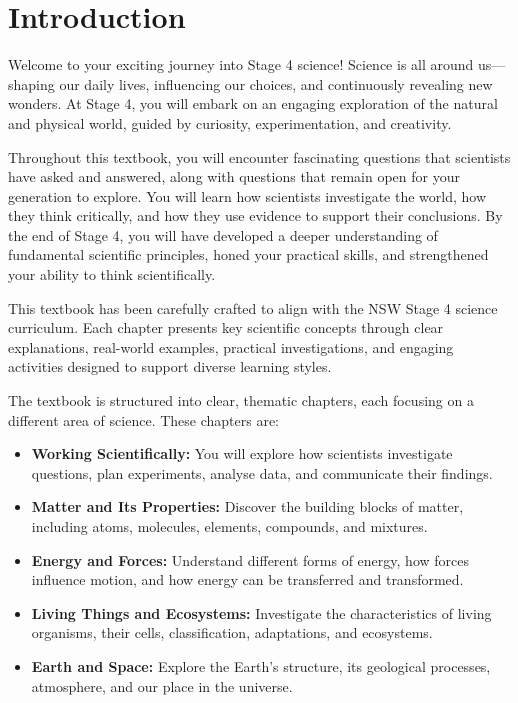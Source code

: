 \chapter{Introduction}

\FloatBarrier
\1

Welcome to your exciting journey into Stage 4 science! Science is all around us—shaping our daily lives, influencing our choices, and continuously revealing new wonders. At Stage 4, you will embark on an engaging exploration of the natural and physical world, guided by curiosity, experimentation, and creativity. 

Throughout this textbook, you will encounter fascinating questions that scientists have asked and answered, along with questions that remain open for your generation to explore. You will learn how scientists investigate the world, how they think critically, and how they use evidence to support their conclusions. By the end of Stage 4, you will have developed a deeper understanding of fundamental scientific principles, honed your practical skills, and strengthened your ability to think scientifically.

\FloatBarrier
\1

This textbook has been carefully crafted to align with the NSW Stage 4 science curriculum. Each chapter presents key scientific concepts through clear explanations, real-world examples, practical investigations, and engaging activities designed to support diverse learning styles.

The textbook is structured into clear, thematic chapters, each focusing on a different area of science. These chapters are:

\begin{itemize}
\item \textbf{Working Scientifically:} You will explore how scientists investigate questions, plan experiments, analyse data, and communicate their findings. 
\item \textbf{Matter and Its Properties:} Discover the building blocks of matter, including atoms, molecules, elements, compounds, and mixtures.
\item \textbf{Energy and Forces:} Understand different forms of energy, how forces influence motion, and how energy can be transferred and transformed.
\item \textbf{Living Things and Ecosystems:} Investigate the characteristics of living organisms, their cells, classification, adaptations, and ecosystems.
\item \textbf{Earth and Space:} Explore the Earth's structure, its geological processes, atmosphere, and our place in the universe.
\end{itemize}

